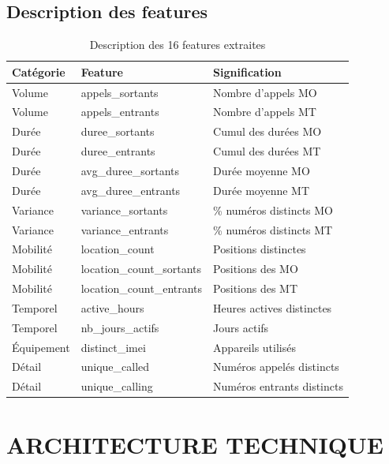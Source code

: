 \documentclass[12pt, oneside, a4paper]{report}
\begin{document}
\subsection{Description des features}
\begin{table}[H]
\centering
\caption{Description des 16 features extraites}
\label{tab:features}
\vspace{0.5cm}
\small
\renewcommand{\arraystretch}{1.3}
\begin{tabular}{|l|l|p{6cm}|}
\hline
\textbf{Catégorie} & \textbf{Feature} & \textbf{Signification} \\
\hline
Volume & appels\_sortants & Nombre d'appels MO \\
\hline
Volume & appels\_entrants & Nombre d'appels MT \\
\hline
Durée & duree\_sortants & Cumul des durées MO \\
\hline
Durée & duree\_entrants & Cumul des durées MT \\
\hline
Durée & avg\_duree\_sortants & Durée moyenne MO \\
\hline
Durée & avg\_duree\_entrants & Durée moyenne MT \\
\hline
Variance & variance\_sortants & \% numéros distincts MO \\
\hline
Variance & variance\_entrants & \% numéros distincts MT \\
\hline
Mobilité & location\_count & Positions distinctes \\
\hline
Mobilité & location\_count\_sortants & Positions des MO \\
\hline
Mobilité & location\_count\_entrants & Positions des MT \\
\hline
Temporel & active\_hours & Heures actives distinctes \\
\hline
Temporel & nb\_jours\_actifs & Jours actifs \\
\hline
Équipement & distinct\_imei & Appareils utilisés \\
\hline
Détail & unique\_called & Numéros appelés distincts \\
\hline
Détail & unique\_calling & Numéros entrants distincts \\
\hline
\end{tabular}
\end{table}
\section{ARCHITECTURE TECHNIQUE}
\end{document}
